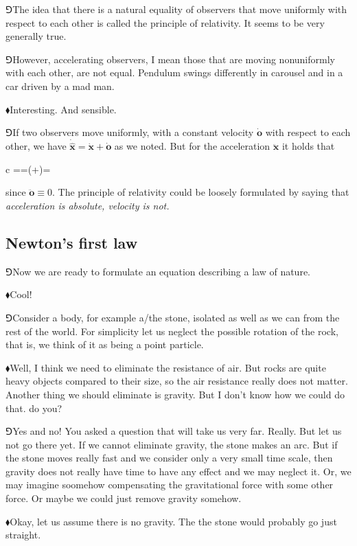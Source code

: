 \documentclass[11pt,oneside%
]{memoir}
\newenvironment{eqna}{\begin{IEEEeqnarray*}{c}}{\end{IEEEeqnarray*}\ignorespacesafterend}
\newcommand{\der}[2]{\frac{\dd#1}{\dd#2}}
\newcommand{\dd}{\mathrm{d}}
\renewcommand{\vec}[1]{\mathbf{#1}}
\newcommand{\dvec}[1]{\dot{\vec{#1}}}
\newcommand{\pvec}[1]{\primed{\vec{#1}}}
\newcommand{\primed}[1]{\hat{#1}}
\newcommand{\hea}{\(\blacklozenge\)\;}
\newcommand{\heb}{\(\Game\)\;}
\begin{document}
\heb The idea that there is a natural equality of observers that move uniformly with respect to each other is called the principle of relativity. It seems to be very generally true.

\heb However, accelerating observers, I mean those that are moving nonuniformly with each other, are not equal. Pendulum swings differently in carousel and in a car driven by a mad man.

\hea Interesting. And sensible.

\heb If two observers move uniformly, with a constant velocity \(\dvec{o}\) with respect to each other, we have \(\dot{\pvec{x}}=\dvec{x}+\dvec{o}\) as we noted. But for the acceleration \(\ddot{\vec{x}}\) it holds that
\begin{eqna}
    \ddot{\pvec{x}}=\der{}{t}\dot{\pvec{x}}=\der{}{t}(\dvec{x}+\dvec{o})=\ddot{\vec{x}}
\end{eqna}
since \(\ddot{\vec{o}}\equiv 0\). The principle of relativity could be loosely formulated by saying that \emph{acceleration is absolute, velocity is not.}
\subsection{Newton's first law}
\heb Now we are ready to formulate an equation describing a law of nature.

\hea Cool!

\heb Consider a body, for example a/the stone, isolated as well as we can from the rest of the world. For simplicity let us neglect the possible rotation of the rock, that is, we think of it as being a point particle.

\hea Well, I think we need to eliminate the resistance of air. But rocks are quite heavy objects compared to their size, so the air resistance really does not matter. Another thing we should eliminate is gravity. But I don't know how we could do that. do you?

\heb Yes and no! You asked a question that will take us very far. Really. But let us not go there yet. If we cannot eliminate gravity, the stone makes an arc. But if the stone moves really fast and we consider only a very small time scale, then gravity does not really have time to have any effect and we may neglect it. Or, we may imagine soomehow compensating the gravitational force with some other force. Or maybe we could just remove gravity somehow.

\hea Okay, let us assume there is no gravity. The the stone would probably go just straight.
\end{document}

